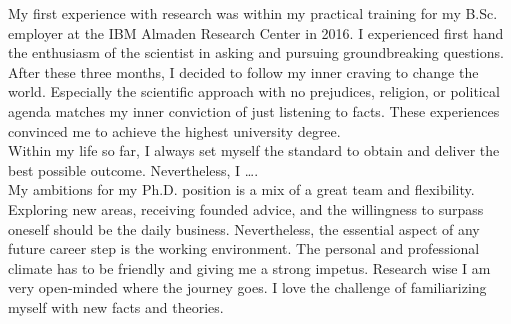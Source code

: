 

\newcommand{\hmwkTitle}{} %
\newcommand{\hmwkClass}{Submission for PhD position in computational social sciences at ETH Zürich} %
\newcommand{\hmwkAuthorName}{Marius Herget} %


\usepackage[defernumbers=true,style=numeric,backend=biber,]{biblatex}
\nocite{*}



\maketitle\tableofcontents\newpage
%
%
\begin{homeworkProblem}
  My first experience with research was within my practical training for my B.Sc. employer at the IBM Almaden Research Center in 2016. I experienced first hand the enthusiasm of the scientist in asking and pursuing groundbreaking questions. After these three months, I decided to follow my inner craving to change the world. Especially the scientific approach with no prejudices, religion, or political agenda matches my inner conviction of just listening to facts. These experiences convinced me to achieve the highest university degree.\\

  Within my life so far, I always set myself the standard to obtain and deliver the best possible outcome. Nevertheless, I \dots. \\

  My ambitions for my Ph.D. position is a mix of a great team and flexibility. Exploring new areas, receiving founded advice, and the willingness to surpass oneself should be the daily business. Nevertheless, the essential aspect of any future career step is the working environment. The personal and professional climate has to be friendly and giving me a strong impetus. Research wise I am very open-minded where the journey goes. I love the challenge of familiarizing myself with new facts and theories.
\end{homeworkProblem}

